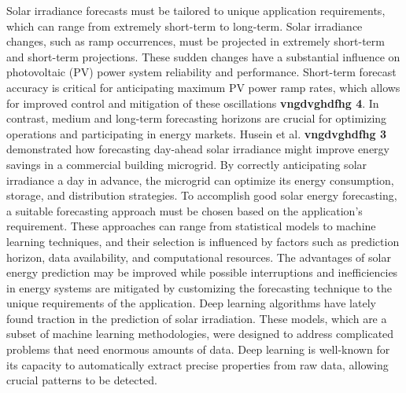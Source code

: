 \documentclass[a4paper,fleqn]{cas-sc}
\begin{document}
Solar irradiance forecasts must be tailored to unique application requirements, which can range from extremely short-term to long-term. Solar irradiance changes, such as ramp occurrences, must be projected in extremely short-term and short-term projections. These sudden changes have a substantial influence on photovoltaic (PV) power system reliability and performance. Short-term forecast accuracy is critical for anticipating maximum PV power ramp rates, which allows for improved control and mitigation of these oscillations \textbf{vngdvghdfhg 4}. In contrast, medium and long-term forecasting horizons are crucial for optimizing operations and participating in energy markets. Husein et al. \textbf{vngdvghdfhg 3} demonstrated how forecasting day-ahead solar irradiance might improve energy savings in a commercial building microgrid. By correctly anticipating solar irradiance a day in advance, the microgrid can optimize its energy consumption, storage, and distribution strategies. To accomplish good solar energy forecasting, a suitable forecasting approach must be chosen based on the application's requirement. These approaches can range from statistical models to machine learning techniques, and their selection is influenced by factors such as prediction horizon, data availability, and computational resources. The advantages of solar energy prediction may be improved while possible interruptions and inefficiencies in energy systems are mitigated by customizing the forecasting technique to the unique requirements of the application.
Deep learning algorithms have lately found traction in the prediction of solar irradiation. These models, which are a subset of machine learning methodologies, were designed to address complicated problems that need enormous amounts of data. Deep learning is well-known for its capacity to automatically extract precise properties from raw data, allowing crucial patterns to be detected.
\end{document}
